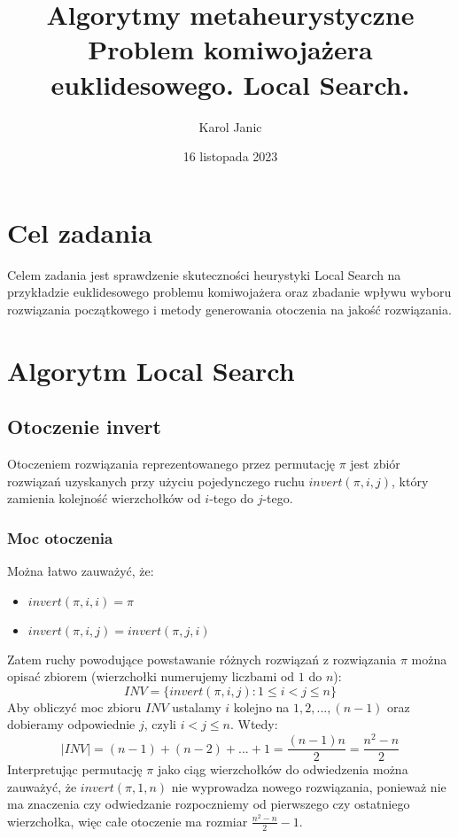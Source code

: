\documentclass{article}
\begin{document}
\begin{titlingpage}
    \title{Algorytmy metaheurystyczne\\[1ex] \large Problem komiwojażera euklidesowego. Local Search.}
    \author{Karol Janic}
    \date{16 listopada 2023}

    \maketitle
\end{titlingpage}

\tableofcontents

\newpage

\section{Cel zadania}
Celem zadania jest sprawdzenie skuteczności heurystyki Local Search na przykładzie euklidesowego problemu komiwojażera oraz
zbadanie wpływu wyboru rozwiązania początkowego i metody generowania otoczenia na jakość rozwiązania.

\section{Algorytm Local Search}
\subsection{Otoczenie invert}
Otoczeniem rozwiązania reprezentowanego przez permutację $\pi$ jest zbiór rozwiązań uzyskanych przy użyciu pojedynczego 
ruchu $invert(\pi, i, j)$, który zamienia kolejność wierzchołków od $i$-tego do $j$-tego.
\subsubsection{Moc otoczenia}
Można łatwo zauważyć, że:
\begin{itemize}
    \item $invert(\pi, i, i) = \pi$
    \item $invert(\pi, i, j) = invert(\pi, j, i)$
\end{itemize}
Zatem ruchy powodujące powstawanie różnych rozwiązań z rozwiązania $\pi$ można opisać zbiorem
(wierzchołki numerujemy liczbami od $1$ do $n$):
$$INV = \{invert(\pi, i, j) : 1 \leq i < j \leq n\}$$
Aby obliczyć moc zbioru $INV$ ustalamy $i$ kolejno na $1, 2, ..., (n-1)$ oraz dobieramy odpowiednie $j$, 
czyli $i < j \leq n$. Wtedy:
$$|INV| = (n-1) + (n-2) + ... + 1 = \frac{(n-1)n}{2} = \frac{n^2 - n}{2}$$
Interpretując permutację $\pi$ jako ciąg wierzchołków do odwiedzenia można zauważyć, że $invert(\pi, 1, n)$
nie wyprowadza nowego rozwiązania, ponieważ nie ma znaczenia czy odwiedzanie rozpoczniemy od pierwszego czy ostatniego wierzchołka, 
więc całe otoczenie ma rozmiar $\frac{n^2 - n}{2} - 1$.
\end{document}
